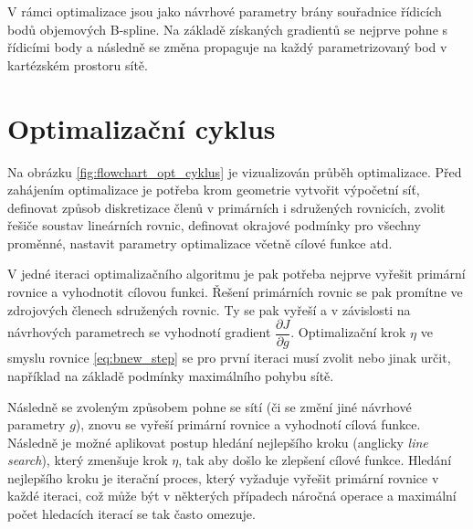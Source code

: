 V rámci optimalizace jsou jako návrhové parametry brány souřadnice řídicích bodů objemových B-spline. Na základě získaných gradientů se nejprve pohne s řídicími body a následně se změna propaguje na každý parametrizovaný bod v kartézském prostoru sítě.


\newpage
\section{Optimalizační cyklus}

Na obrázku \ref{fig:flowchart_opt_cyklus} je vizualizován průběh optimalizace. Před zahájením optimalizace je potřeba krom geometrie vytvořit výpočetní síť, definovat způsob diskretizace členů v primárních i sdružených rovnicích, zvolit řešiče soustav lineárních rovnic, definovat okrajové podmínky pro všechny proměnné, nastavit parametry optimalizace včetně cílové funkce atd. 

V jedné iteraci optimalizačního algoritmu je pak potřeba nejprve vyřešit primární rovnice a vyhodnotit cílovou funkci. Řešení primárních rovnic se pak promítne ve zdrojových členech sdružených rovnic. Ty se pak vyřeší a v závislosti na návrhových parametrech se vyhodnotí gradient $ \dfrac{\partial J}{\partial g} $. Optimalizační krok $ \eta $ ve smyslu rovnice \ref{eq:bnew_step} se pro první iteraci musí zvolit nebo jinak určit, například na základě podmínky maximálního pohybu sítě.

Následně se zvoleným způsobem pohne se sítí (či se změní jiné návrhové parametry $ g $), znovu se vyřeší primární rovnice a vyhodnotí cílová funkce. Následně je možné aplikovat postup hledání nejlepšího kroku (anglicky \textit{line search}), který zmenšuje krok $ \eta $, tak aby došlo ke zlepšení cílové funkce. Hledání nejlepšího kroku je iterační proces, který vyžaduje vyřešit primární rovnice v každé iteraci, což může být v některých případech náročná operace a maximální počet hledacích iterací se tak často omezuje.

